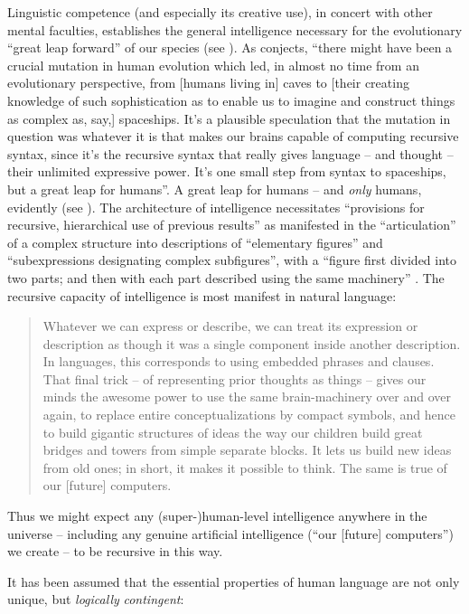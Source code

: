 \documentclass[output=paper]{langsci/langscibook}
\begin{document}
Linguistic competence (and especially its creative use), in concert with other
mental faculties, establishes the general intelligence necessary for the
evolutionary “great leap forward” of our species (see \citealt{Chomsky2016book}).
As \citet[182]{Roberts2017} conjects, “there might have been a crucial mutation
in human evolution which led, in almost no time from an evolutionary
perspective, from [humans living in] caves to [their creating knowledge of such
sophistication as to enable us to imagine and construct things as complex as,
say,] spaceships. It’s a plausible speculation that the mutation in question
was whatever it is that makes our brains capable of computing recursive syntax,
since it’s the recursive syntax that really gives language – and thought –
their unlimited expressive power. It’s one small step from syntax to
spaceships, but a great leap for humans”. A great leap for humans – and
\emph{only} humans, evidently (see \citealt{BerwickChomsky2016}). The
architecture of intelligence necessitates “provisions for recursive,
hierarchical use of previous results” as manifested in the “articulation” of a
complex structure into descriptions of “elementary figures” and “subexpressions
designating complex subfigures”, with a “figure first divided into two parts;
and then with each part described using the same machinery”
\citep[16]{Minsky1963}. The recursive capacity of intelligence is most manifest
in natural language:

\begin{quote}Whatever we can express or describe, we can treat its
expression or description as though it was a single component inside another
description. In languages, this corresponds to using embedded phrases and
clauses. That final trick – of representing prior thoughts as things – gives
our minds the awesome power to use the same brain-machinery over and over
again, to replace entire conceptualizations by compact symbols, and hence to
build gigantic structures of ideas the way our children build great bridges and
towers from simple separate blocks. It lets us build new ideas from old ones;
in short, it makes it possible to think. The same is true of our [future]
computers. \hfill\hbox{\citep[124]{Minsky1985}}\end{quote}
Thus we might expect any \mbox{(super-)}human-level intelligence anywhere in the universe –
including any genuine artificial intelligence (“our [future] computers”) we create –
to be recursive in this way.

It has been assumed that the essential properties of human language are not
only unique, but \emph{logically} \emph{contingent}:
\end{document}

